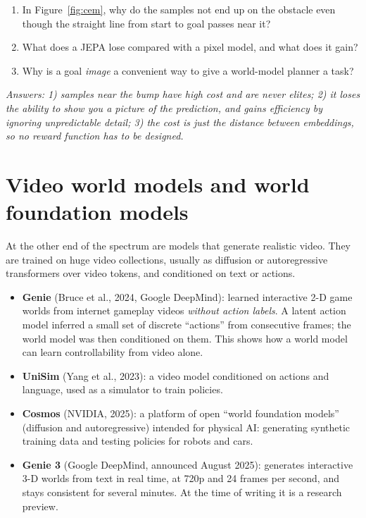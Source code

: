 \begin{quizbox}
\begin{enumerate}[leftmargin=*]
\item In Figure~\ref{fig:cem}, why do the samples not end up on the obstacle even though the straight line from start to goal passes near it?
\item What does a JEPA lose compared with a pixel model, and what does it gain?
\item Why is a goal \emph{image} a convenient way to give a world-model planner a task?
\end{enumerate}
\emph{Answers: 1) samples near the bump have high cost and are never elites; 2) it loses the ability to show you a picture of the prediction, and gains efficiency by ignoring unpredictable detail; 3) the cost is just the distance between embeddings, so no reward function has to be designed.}
\end{quizbox}

\section{Video world models and world foundation models}
\label{sec:video}

At the other end of the spectrum are models that generate realistic video. They are trained on huge video collections, usually as diffusion or autoregressive transformers over video tokens, and conditioned on text or actions.
\begin{itemize}
\item \textbf{Genie} (Bruce et al., 2024, Google DeepMind): learned interactive 2-D game worlds from internet gameplay videos \emph{without action labels}. A latent action model inferred a small set of discrete ``actions'' from consecutive frames; the world model was then conditioned on them. This shows how a world model can learn controllability from video alone.
\item \textbf{UniSim} (Yang et al., 2023): a video model conditioned on actions and language, used as a simulator to train policies.
\item \textbf{Cosmos} (NVIDIA, 2025): a platform of open ``world foundation models'' (diffusion and autoregressive) intended for physical AI: generating synthetic training data and testing policies for robots and cars.
\item \textbf{Genie 3} (Google DeepMind, announced August 2025): generates interactive 3-D worlds from text in real time, at 720p and 24 frames per second, and stays consistent for several minutes. At the time of writing it is a research preview.
\end{itemize}

